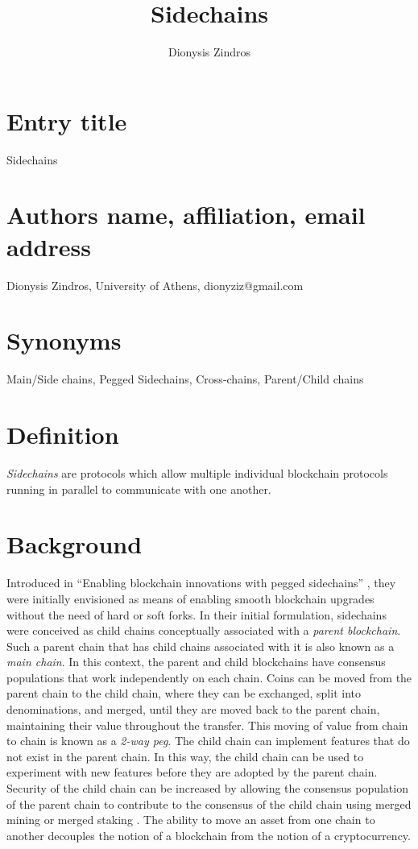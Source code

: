 \documentclass[runningheads]{format/llncs}
\title{
Sidechains
}
\author{Dionysis Zindros}
\institute{University of Athens}
\begin{document}
\maketitle

\section*{Entry title}
Sidechains

\section*{Authors name, affiliation, email address}
Dionysis Zindros,
University of Athens,
dionyziz@gmail.com

\section*{Synonyms}
Main/Side chains, Pegged Sidechains, Cross-chains, Parent/Child chains

\section*{Definition}
\emph{Sidechains} are protocols which allow multiple individual blockchain protocols running in parallel to communicate with one another.

\section*{Background}
Introduced in ``Enabling blockchain innovations with pegged sidechains'' \cite{sidechains}, they were initially envisioned as means of enabling smooth blockchain upgrades without the need of hard or soft forks. In their initial formulation, sidechains were conceived as child chains conceptually associated with a \emph{parent blockchain}. Such a parent chain that has child chains associated with it is also known as a \emph{main chain}. In this context, the parent and child blockchains have consensus populations that work independently on each chain. Coins can be moved from the parent chain to the child chain, where they can be exchanged, split into denominations, and merged, until they are moved back to the parent chain, maintaining their value throughout the transfer. This moving of value from chain to chain is known as a \emph{2-way peg}. The child chain can implement features that do not exist in the parent chain. In this way, the child chain can be used to experiment with new features before they are adopted by the parent chain. Security of the child chain can be increased by allowing the consensus population of the parent chain to contribute to the consensus of the child chain using merged mining or merged staking \cite{pos-sidechains}. The ability to move an asset from one chain to another decouples the notion of a blockchain from the notion of a cryptocurrency.
\end{document}
